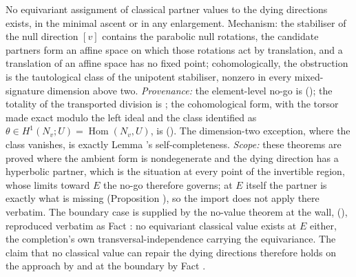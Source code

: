 No equivariant assignment of classical partner values to the dying directions exists, in the minimal ascent or in any enlargement. Mechanism: the stabiliser of the null direction $[v]$ contains the parabolic null rotations, the candidate partners form an affine space on which those rotations act by translation, and a translation of an affine space has no fixed point; cohomologically, the obstruction is the tautological class of the unipotent stabiliser, nonzero in every mixed-signature dimension above two. \emph{Provenance:} the element-level no-go is \cite[Thm.~4.2]{ButlerT1} (); the totality of the transported division is \cite[Thm.~4.10]{ButlerT1}; the cohomological form, with the torsor made exact modulo the left ideal and the class identified as $\theta \in H^1(N_v; U) = \operatorname{Hom}(N_v, U)$, is \cite[Thm.~4.8]{ButlerT1} (). The dimension-two exception, where the class vanishes, is exactly Lemma 's self-completeness. \emph{Scope:} these theorems are proved where the ambient form is nondegenerate and the dying direction has a hyperbolic partner, which is the situation at every point of the invertible region, whose limits toward $E$ the no-go therefore governs; at $E$ itself the partner is exactly what is missing (Proposition ), so the import does not apply there verbatim. The boundary case is supplied by the no-value theorem at the wall, \cite[Thm.~10.4]{ButlerT4} (), reproduced verbatim as Fact : no equivariant classical value exists at $E$ either, the completion's own transversal-independence carrying the equivariance. The claim that no classical value can repair the dying directions therefore holds on the approach by \cite[Thm.~4.2]{ButlerT1} and at the boundary by Fact .
